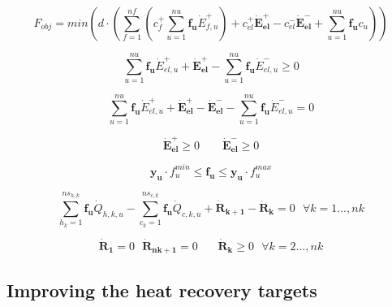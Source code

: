 \begin{equation}\label{eq:HC_obj}
F_{obj} = min (d \cdot (\sum_{f=1}^{nf} (c_{f}^+  \sum_{u=1}^{nu} \boldsymbol{f_u} \dot{E}_{f,u}^+) + c_{el}^{+} \boldsymbol{\dot{E}_{el}^+} - c_{el}^{-} \boldsymbol{\dot{E}_{el}^-} +  \sum_{u=1}^{nu} \boldsymbol {f_u} c_{u} )) 
\end{equation}

   
\begin{equation}\label{eq:elec-cons}
\sum_{u=1}^{nu} \boldsymbol {f_{u}} \dot{E}_{el,u}^+ + \boldsymbol {\dot{E}_{el}^+} - \sum_{u=1}^{nu} \boldsymbol {f_{u}} \dot{E}_{el,u}^- \geq 0
\end{equation}

\begin{equation}
\label{eq:elec-exp}
\sum_{u=1}^{nu} \boldsymbol {f_{u}} \dot{E}_{el,u}^+ + \boldsymbol {\dot{E}_{el}^+} - \boldsymbol {\dot{E}_{el}^-} - \sum_{u=1}^{nu} \boldsymbol {f_{u}} \dot{E}_{el,u}^- = 0
\end{equation}


\begin{equation}
\label{eq:elec-constraints}
\boldsymbol {\dot{E}_{el}^+}  \geq 0 ~~~~~~~~~ \boldsymbol {\dot{E}_{el}^-} \geq 0
\end{equation}

\begin{equation}
\label{eq:mult-max}
\boldsymbol {y_{u}} \cdot f_{u}^{min} \leq \boldsymbol {f_{u}} \leq \boldsymbol {y_{u}} \cdot f_{u}^{max} 
\end{equation}


\begin{equation}
 \label{eq:heat-cascade}
\sum_{h_k=1}^{ns_{h,k}}{\boldsymbol {f_u} \dot{Q}_{h,k,u}} - \sum_{c_k=1}^{ns_{c,k}}{\boldsymbol {f_u} \dot{Q}_{c,k,u} } +\boldsymbol {\dot{R}_{k+1}}  -\boldsymbol {\dot{R}_{k}}   = 0
~~~\forall k=1...,nk
\end{equation}



\begin{equation}
\label{eq:Rk-constraints}
\boldsymbol {\dot{R}_{1}} = 0 ~~~ \boldsymbol {\dot{R}_{nk+1}}=0 ~~~~~~~~ \boldsymbol {\dot{R}_{k}} \geq 0 ~~~\forall k=2...,nk
\end{equation}

\subsection{Improving the heat recovery targets}
\label{sec:TSIheatrecovery}

